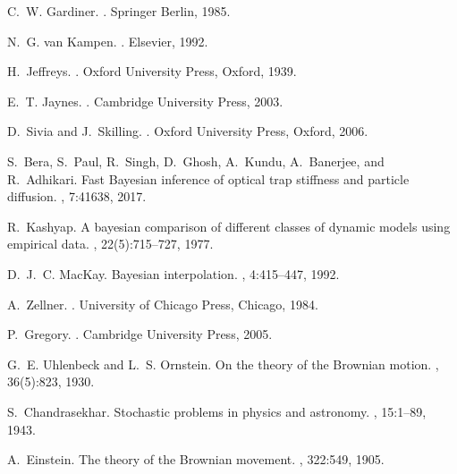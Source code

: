 \documentclass[english,aps, twocolumn, pre,superscriptaddress, notitlepage]{revtex4-1}
\begin{document}
\begin{thebibliography}{10}

C.~W. Gardiner.
.
\newblock Springer Berlin, 1985.

N.~G. van Kampen.
.
\newblock Elsevier, 1992.

H.~Jeffreys.
.
\newblock Oxford University Press, Oxford, 1939.

E.~T. Jaynes.
.
\newblock Cambridge University Press, 2003.

D.~Sivia and J.~Skilling.
.
\newblock Oxford University Press, Oxford, 2006.

S.~Bera, S.~Paul, R.~Singh, D.~Ghosh, A.~Kundu, A.~Banerjee, and R.~Adhikari.
\newblock Fast {B}ayesian inference of optical trap stiffness and particle
  diffusion.
, 7:41638, 2017.

R.~Kashyap.
\newblock A bayesian comparison of different classes of dynamic models using
  empirical data.
, 22(5):715--727, 1977.

D.~J.~C. MacKay.
\newblock Bayesian interpolation.
, 4:415--447, 1992.

A.~Zellner.
.
\newblock University of Chicago Press, Chicago, 1984.

P.~Gregory.
.
\newblock Cambridge University Press, 2005.

G.~E. Uhlenbeck and L.~S. Ornstein.
\newblock On the theory of the Brownian motion.
, 36(5):823, 1930.

S.~Chandrasekhar.
\newblock Stochastic problems in physics and astronomy.
, 15:1--89, 1943.

A.~Einstein.
\newblock The theory of the {B}rownian movement.
, 322:549, 1905.


\end{thebibliography}
\end{document}
